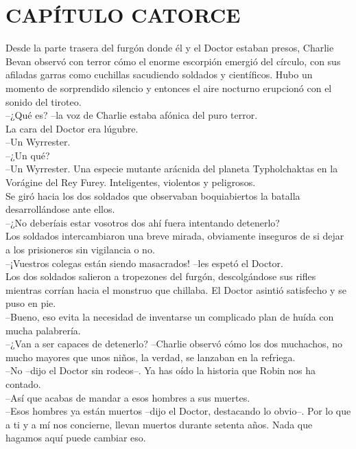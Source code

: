 \chapter*{CAPÍTULO CATORCE}
Desde la parte trasera del furgón donde él y el Doctor estaban presos,
Charlie Bevan observó con terror cómo el enorme escorpión emergió del
círculo, con sus afiladas garras como cuchillas sacudiendo soldados y
científicos. Hubo un momento de sorprendido silencio y entonces el aire
nocturno erupcionó con el sonido del tiroteo.\\
--¿Qué es? --la voz de Charlie estaba afónica del puro terror.\\
La cara del Doctor era lúgubre.\\
--Un Wyrrester.\\
--¿Un qué?\\
--Un Wyrrester. Una especie mutante arácnida del planeta Typholchaktas
en la Vorágine del Rey Furey. Inteligentes, violentos y peligrosos.\\
Se giró hacia los dos soldados que observaban boquiabiertos la batalla
desarrollándose ante ellos.\\
--¿No deberíais estar vosotros dos ahí fuera intentando detenerlo?\\
Los soldados intercambiaron una breve mirada, obviamente inseguros de si
dejar a los prisioneros sin vigilancia o no.\\
--¡Vuestros colegas están siendo masacrados! --les espetó el Doctor.\\
Los dos soldados salieron a tropezones del furgón, descolgándose sus
rifles mientras corrían hacia el monstruo que chillaba. El Doctor
asintió satisfecho y se puso en pie.\\
--Bueno, eso evita la necesidad de inventarse un complicado plan de
huída con mucha palabrería.\\
--¿Van a ser capaces de detenerlo? --Charlie observó cómo los dos
muchachos, no mucho mayores que unos niños, la verdad, se lanzaban en la
refriega.\\
--No --dijo el Doctor sin rodeos--. Ya has oído la historia que Robin
nos ha contado.\\
--Así que acabas de mandar a esos hombres a sus muertes.\\
--Esos hombres ya están muertos --dijo el Doctor, destacando lo obvio--.
Por lo que a ti y a mí nos concierne, llevan muertos durante setenta
años. Nada que hagamos aquí puede cambiar eso.\\

